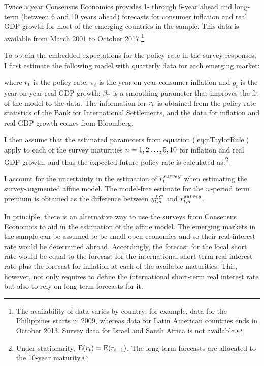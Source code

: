 {Twice a year Consensus Economics provides 1- through 5-year ahead and long-term (between 6 and 10 years ahead) forecasts for consumer inflation and real GDP growth for most of the emerging countries in the sample. This data is available from March 2001 to October 2017.\footnote{ The availability of data varies by country; for example, data for the Philippines starts in 2009, whereas data for Latin American countries ends in October 2013. Survey data for Israel and South Africa is not available.}

To obtain the embedded expectations for the policy rate in the survey responses, I first estimate the following model with quarterly data for each emerging market:

\noindent where $r_{t}$ is the policy rate, $\pi_{t}$ is the year-on-year consumer inflation and $g_{t}$ is the year-on-year real GDP growth; 
$\beta_{r}$ is a smoothing parameter that improves the fit of the model to the data. 
The information for $r_{t}$ is obtained from the policy rate statistics of the Bank for International Settlements, and the data for inflation and real GDP growth comes from Bloomberg.

I then assume that the estimated parameters from equation (\ref{eq:nTaylorRule}) apply to each of the survey maturities \(n = 1, 2 \ldots, 5, 10\) for inflation and real GDP growth, and thus the expected future policy rate is calculated as:\footnote{ Under stationarity, $\mathrm{E}(r_{t}) = \mathrm{E}(r_{t-1})$. The long-term forecasts are allocated to the 10-year maturity.}
	
I account for the uncertainty in the estimation of \(r_{t}^{survey}\) when estimating the survey-augmented affine model.
The model-free estimate for the $n$-period term premium is obtained as the difference between \(y_{t,n} ^{LC}\) and \(r_{t,n}^{survey}\).
%	

In principle, there is an alternative way to use the surveys from Consensus Economics to aid in the estimation of the affine model. 
The emerging markets in the sample can be assumed to be small open economies and so their real interest rate would be determined abroad. Accordingly, the forecast for the local short rate would be equal to the forecast for the international short-term real interest rate plus the forecast for inflation at each of the available maturities. This, however, not only requires to define the international short-term real interest rate but also to rely on long-term forecasts for it.


}
